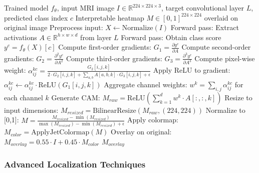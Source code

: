 \documentclass[a4paper,fleqn]{cas-sc}
\begin{document}
\begin{algorithm}[!htbp]
\caption{Grad-CAM++ Heatmap Generation}
\label{alg:gradcam}
\begin{algorithmic}[1]
\Require Trained model $f_\theta$, input MRI image $I \in \mathbb{R}^{224 \times 224 \times 3}$, target convolutional layer $L$, predicted class index $c$
\Ensure Interpretable heatmap $M \in [0,1]^{224 \times 224}$ overlaid on original image
\State Preprocess input: $X \leftarrow \text{Normalize}(I)$ 
\State Forward pass: Extract activations $A \in \mathbb{R}^{h \times w \times d}$ from layer $L$
\State Forward pass: Obtain class score $y^c = f_\theta(X)[c]$
\State Compute first-order gradients: $G_1 = \frac{\partial y^c}{\partial A}$
\State Compute second-order gradients: $G_2 = \frac{\partial^2 y^c}{\partial A^2}$
\State Compute third-order gradients: $G_3 = \frac{\partial^3 y^c}{\partial A^3}$
    \State Compute pixel-wise weight: $\alpha^{kc}_{ij} = \frac{G_2[i,j,k]}{2 \cdot G_2[i,j,k] + \sum_{a,b} A[a,b,k] \cdot G_3[i,j,k] + \epsilon}$
    \State Apply ReLU to gradient: $\alpha^{kc}_{ij} \leftarrow \alpha^{kc}_{ij} \cdot \text{ReLU}(G_1[i,j,k])$
\EndFor
\State Aggregate channel weights: $w^k = \sum_{i,j} \alpha^{kc}_{ij}$ for each channel $k$
\State Generate CAM: $M_{raw} = \text{ReLU}\left(\sum_{k=1}^{d} w^k \cdot A[:,:,k]\right)$
\State Resize to input dimensions: $M_{resized} = \text{BilinearResize}(M_{raw}, (224, 224))$
\State Normalize to [0,1]: $M = \frac{M_{resized} - \min(M_{resized})}{\max(M_{resized}) - \min(M_{resized}) + \epsilon}$
\State Apply colormap: $M_{color} = \text{ApplyJetColormap}(M)$ 
\State Overlay on original: $M_{overlay} = 0.55 \cdot I + 0.45 \cdot M_{color}$
\State \Return $M_{overlay}$ 
\end{algorithmic}
\end{algorithm}

\subsubsection{Advanced Localization Techniques}
\end{document}
